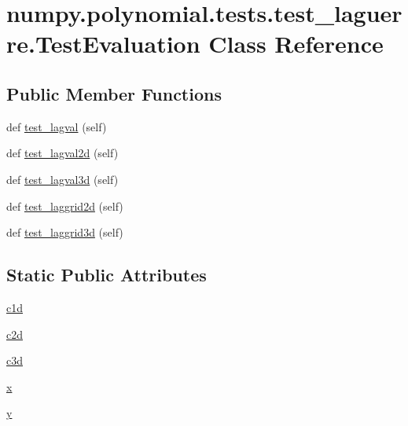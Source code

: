\hypertarget{classnumpy_1_1polynomial_1_1tests_1_1test__laguerre_1_1TestEvaluation}{}\section{numpy.\+polynomial.\+tests.\+test\+\_\+laguerre.\+Test\+Evaluation Class Reference}
\label{classnumpy_1_1polynomial_1_1tests_1_1test__laguerre_1_1TestEvaluation}
\subsection*{Public Member Functions}
\begin{DoxyCompactItemize}
\item 
def \hyperlink{classnumpy_1_1polynomial_1_1tests_1_1test__laguerre_1_1TestEvaluation_abfae40cd5ccf34094cf82f43e53fa89f}{test\+\_\+lagval} (self)
\item 
def \hyperlink{classnumpy_1_1polynomial_1_1tests_1_1test__laguerre_1_1TestEvaluation_ae033872e93c901671f969b1e8bba9f2a}{test\+\_\+lagval2d} (self)
\item 
def \hyperlink{classnumpy_1_1polynomial_1_1tests_1_1test__laguerre_1_1TestEvaluation_a37cf6745314942dde589ce29638efcfd}{test\+\_\+lagval3d} (self)
\item 
def \hyperlink{classnumpy_1_1polynomial_1_1tests_1_1test__laguerre_1_1TestEvaluation_aa19bbe020dae7abec15b1a01e3ac0a6d}{test\+\_\+laggrid2d} (self)
\item 
def \hyperlink{classnumpy_1_1polynomial_1_1tests_1_1test__laguerre_1_1TestEvaluation_a2fec5d9ab4bf0c16a44c84aece6754fb}{test\+\_\+laggrid3d} (self)
\end{DoxyCompactItemize}
\subsection*{Static Public Attributes}
\begin{DoxyCompactItemize}
\item 
\hyperlink{classnumpy_1_1polynomial_1_1tests_1_1test__laguerre_1_1TestEvaluation_a708926f34ce6ab8d68ed6796ffd41664}{c1d}
\item 
\hyperlink{classnumpy_1_1polynomial_1_1tests_1_1test__laguerre_1_1TestEvaluation_aa7fa95cd27661ce70f249fc1404688ec}{c2d}
\item 
\hyperlink{classnumpy_1_1polynomial_1_1tests_1_1test__laguerre_1_1TestEvaluation_a59255aa424b295c492cf9ec27d3d51b4}{c3d}
\item 
\hyperlink{classnumpy_1_1polynomial_1_1tests_1_1test__laguerre_1_1TestEvaluation_a43165bffdc428b6595a01c19bdbb924d}{x}
\item 
\hyperlink{classnumpy_1_1polynomial_1_1tests_1_1test__laguerre_1_1TestEvaluation_a43f001e111390fb9e9bf43ac7f0d2927}{y}
\end{DoxyCompactItemize}


